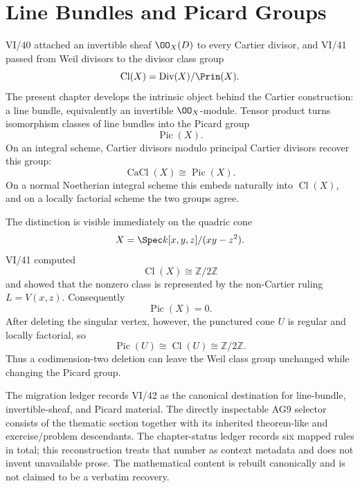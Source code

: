 \chapter{Line Bundles and Picard Groups}
\label{ch:vi42-line-bundles-picard-groups}
\providecommand{\Pic}{\operatorname{Pic}}
\providecommand{\Cl}{\operatorname{Cl}}
\providecommand{\CaDiv}{\operatorname{CaDiv}}
\providecommand{\CaCl}{\operatorname{CaCl}}
\providecommand{\Div}{\operatorname{Div}}

VI/40 attached an invertible sheaf \(\OO_X(D)\) to every Cartier divisor, and VI/41 passed from Weil divisors to the divisor class group
\[
  \Cl(X)=\Div(X)/\Prin(X).
\]
The present chapter develops the intrinsic object behind the Cartier construction: a line bundle, equivalently an invertible \(\OO_X\)-module.  Tensor product turns isomorphism classes of line bundles into the Picard group
\[
  \Pic(X).
\]
On an integral scheme, Cartier divisors modulo principal Cartier divisors recover this group:
\[
  \CaCl(X)\cong\Pic(X).
\]
On a normal Noetherian integral scheme this embeds naturally into \(\Cl(X)\), and on a locally factorial scheme the two groups agree.

The distinction is visible immediately on the quadric cone
\[
  X=\Spec k[x,y,z]/(xy-z^2).
\]
VI/41 computed
\[
  \Cl(X)\cong\mathbb Z/2\mathbb Z
\]
and showed that the nonzero class is represented by the non-Cartier ruling \(L=V(x,z)\).  Consequently
\[
  \Pic(X)=0.
\]
After deleting the singular vertex, however, the punctured cone \(U\) is regular and locally factorial, so
\[
  \Pic(U)\cong\Cl(U)\cong\mathbb Z/2\mathbb Z.
\]
Thus a codimension-two deletion can leave the Weil class group unchanged while changing the Picard group.

The migration ledger records VI/42 as the canonical destination for line-bundle, invertible-sheaf, and Picard material.  The directly inspectable AG9 selector consists of the thematic section together with its inherited theorem-like and exercise/problem descendants.  The chapter-status ledger records six mapped rules in total; this reconstruction treats that number as context metadata and does not invent unavailable prose.  The mathematical content is rebuilt canonically and is not claimed to be a verbatim recovery.

